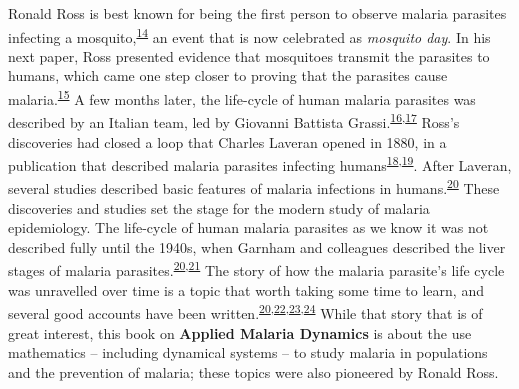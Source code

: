 \documentclass[
]{book}
\begin{document}
Ronald Ross is best known for being the first person to observe malaria parasites infecting a mosquito,\textsuperscript{\protect\hyperlink{ref-RossR1897PeculiarPigmented}{14}} an event that is now celebrated as \emph{mosquito day}.
In his next paper, Ross presented evidence that mosquitoes transmit the parasites to humans, which came one step closer to proving that the parasites cause malaria.\textsuperscript{\protect\hyperlink{ref-RossR1898RoleMosquito}{15}}
A few months later, the life-cycle of human malaria parasites was described by an Italian team, led by Giovanni Battista Grassi.\textsuperscript{\protect\hyperlink{ref-GrassiB1898UlterioriRicerche}{16},\protect\hyperlink{ref-GrassiB1901StudiDi}{17}}
Ross's discoveries had closed a loop that Charles Laveran opened in 1880, in a publication that described malaria parasites infecting humans\textsuperscript{\protect\hyperlink{ref-Laveran1880}{18},\protect\hyperlink{ref-Laveran1884}{19}}.
After Laveran, several studies described basic features of malaria infections in humans.\textsuperscript{\protect\hyperlink{ref-GarnhamPCC1988HistoryDiscoveries}{20}}
These discoveries and studies set the stage for the modern study of malaria epidemiology.
The life-cycle of human malaria parasites as we know it was not described fully until the 1940s, when Garnham and colleagues described the liver stages of malaria parasites.\textsuperscript{\protect\hyperlink{ref-GarnhamPCC1988HistoryDiscoveries}{20},\protect\hyperlink{ref-ShorttHE1948PreerythrocyticStage}{21}}
The story of how the malaria parasite's life cycle was unravelled over time is a topic that worth taking some time to learn, and several good accounts have been written.\textsuperscript{\protect\hyperlink{ref-GarnhamPCC1988HistoryDiscoveries}{20},\protect\hyperlink{ref-Bruce-ChwattLJ1988HistoryMalaria}{22},\protect\hyperlink{ref-ServiceMW1978ShortHistory}{23},\protect\hyperlink{ref-CoxFEG2010HistoryDiscovery}{24}}
While that story that is of great interest, this book on \textbf{Applied Malaria Dynamics} is about the use mathematics -- including dynamical systems -- to study malaria in populations and the prevention of malaria;
these topics were also pioneered by Ronald Ross.
\end{document}

